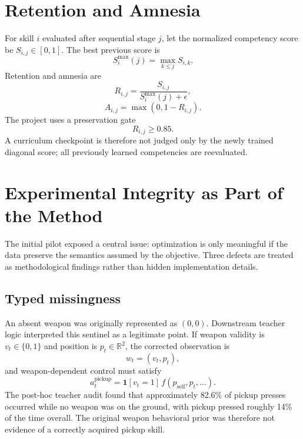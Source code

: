 \documentclass[11pt]{article}
\newcommand{\R}{\mathbb{R}}
\begin{document}
\section{Retention and Amnesia}
For skill $i$ evaluated after sequential stage $j$, let the normalized competency score be $S_{i,j}\in[0,1]$. The best previous score is
\begin{equation}
S_i^{\max}(j)=\max_{k\le j}S_{i,k}.
\end{equation}
Retention and amnesia are
\begin{equation}
R_{i,j}=\frac{S_{i,j}}{S_i^{\max}(j)+\epsilon},
\end{equation}
\begin{equation}
A_{i,j}=\max(0,1-R_{i,j}).
\end{equation}
The project uses a preservation gate
\begin{equation}
R_{i,j}\ge0.85.
\end{equation}
A curriculum checkpoint is therefore not judged only by the newly trained diagonal score; all previously learned competencies are reevaluated.

\section{Experimental Integrity as Part of the Method}
The initial pilot exposed a central issue: optimization is only meaningful if the data preserve the semantics assumed by the objective. Three defects are treated as methodological findings rather than hidden implementation details.

\subsection{Typed missingness}
An absent weapon was originally represented as $(0,0)$. Downstream teacher logic interpreted this sentinel as a legitimate point. If weapon validity is $v_t\in\{0,1\}$ and position is $p_t\in\R^2$, the corrected observation is
\begin{equation}
w_t=(v_t,p_t),
\end{equation}
and weapon-dependent control must satisfy
\begin{equation}
a_t^{\mathrm{pickup}}=\mathbf 1[v_t=1]\,f(p_{\mathrm{self}},p_t,\ldots).
\end{equation}
The post-hoc teacher audit found that approximately 82.6\% of pickup presses occurred while no weapon was on the ground, with pickup pressed roughly 14\% of the time overall. The original weapon behavioral prior was therefore not evidence of a correctly acquired pickup skill.
\end{document}
